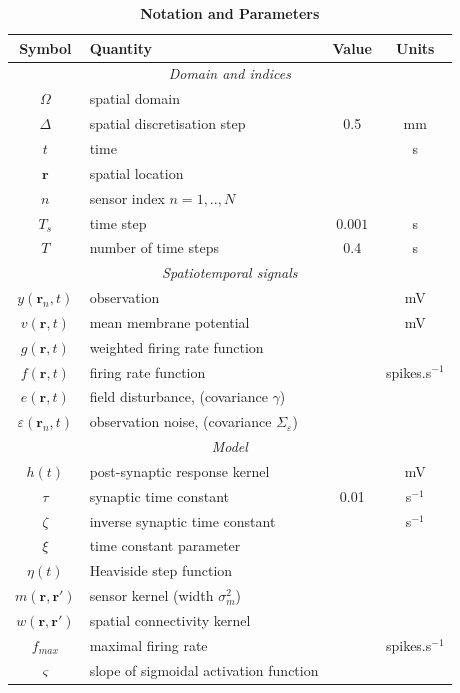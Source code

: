 \documentclass[10pt]{article}
\begin{document}
\begin{table}[!ht]
\caption{
\bf{Notation and Parameters}}
\begin{tabular}{|c|l|c|c|}
	\hline
	\textbf{Symbol} & \textbf{Quantity} & \textbf{Value} & \textbf{Units}\\
	\hline
	\multicolumn{4}{|c|}{\emph{Domain and indices}}\\
	\hline
	$\Omega$ & spatial domain & &\\
	$\Delta$ & spatial discretisation step & 0.5 & mm \\
	$t$ & time & & s\\
	$\mathbf{r}$ & spatial location & &\\
	$n$ & sensor index $n=1,..,N$ & &\\
	$T_s$ & time step & $0.001$ & s\\
	$T$ & number of time steps & 0.4 & s\\
	\hline
	\multicolumn{4}{|c|}{\emph{Spatiotemporal signals}}\\
	\hline
    $y(\mathbf{r}_n,t)$ & observation & & mV\\
    $v(\mathbf{r},t)$ & mean membrane potential & & mV \\
	$g(\mathbf{r},t)$ & weighted firing rate function & & \\
	$f(\mathbf{r},t)$ & firing rate function & & spikes.s$^{-1}$\\
	$e(\mathbf{r},t)$ & field disturbance, (covariance $\gamma$) & &\\
	$\varepsilon(\mathbf{r}_n,t)$ & observation noise, (covariance $\Sigma_\varepsilon$) & &\\
	\hline 
\multicolumn{4}{|c|}{\emph{Model}}\\
	\hline
	$h(t)$ & post-synaptic response kernel & & mV\\
	$\tau$ & synaptic time constant & 0.01 & s$^{-1}$ \\
	$\zeta$ & inverse synaptic time constant & & s$^{-1}$\\
	$\xi$ & time constant parameter & & \\
	$\eta(t)$ & Heaviside step function & & \\
	$m(\mathbf{r},\mathbf{r}')$ & sensor kernel (width $\sigma_m^2$) & & \\
	$w(\mathbf{r},\mathbf{r}')$ & spatial connectivity kernel & & \\
	$f_{max}$ & maximal firing rate & & spikes.s$^{-1}$\\
	$\varsigma$ & slope of sigmoidal activation function & & \\

\end{tabular}
\end{table}
\end{document}

